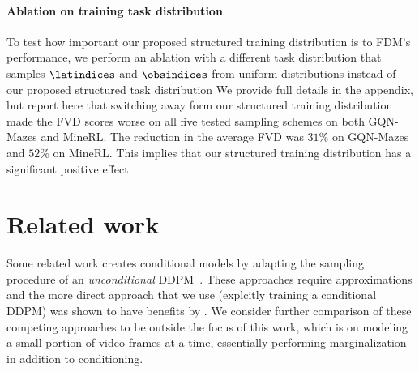 \paragraph{Ablation on training task distribution}
To test how important our proposed structured training distribution is to FDM's performance, we perform an ablation with a different task distribution that samples $\latindices$ and $\obsindices$ from uniform distributions instead of our proposed structured task distribution
We provide full details in the appendix, but report here that switching away form our structured training distribution made the FVD scores worse on all five tested sampling schemes on both GQN-Mazes and MineRL. The reduction in the average FVD was $31\%$ on GQN-Mazes and $52\%$ on MineRL. This implies that our structured training distribution has a significant positive effect.

\section{Related work}
Some related work creates conditional models by adapting the sampling procedure of an \textit{unconditional} DDPM~\citep{song2020score,kadkhodaie2020solving,mittal2021symbolic,ho2022video}. These approaches require approximations and the more direct approach that we use (explcitly training a conditional DDPM) was shown to have benefits by \citet{tashiro2021csdi}. We consider further comparison of these competing approaches to be outside the focus of this work, which is on modeling a small portion of video frames at a time, essentially performing marginalization in addition to conditioning.

